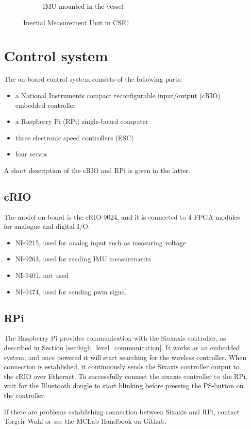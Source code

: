 \begin{figure}[htb!]
\begin{subfigure}{0.45\linewidth}
		\caption{IMU mounted in the vessel}
		\label{fig:IMU_mounted}
	\end{subfigure}
\caption{Inertial Measurement Unit in CSE1}
\end{figure}

\section{Control system}
The on-board control system consists of the following parts:
\begin{itemize}
	\item a National Instruments compact reconfigurable input/output (cRIO)
	embedded controller
	\item a Raspberry Pi (RPi) single-board computer
	\item three electronic speed controllers (ESC)
	\item four servos
\end{itemize}
A short description of the cRIO and RPi is given in the latter. 
\subsection{cRIO}
The model on-board is the cRIO-9024, and it is connected to 4 FPGA modules for analogue and digital I/O:
\begin{itemize}
	\item NI-9215, used for analog input such as measuring voltage
	\item NI-9263, used for reading IMU measurements
	\item NI-9401, not used
	\item NI-9474, used for sending pwm signal
\end{itemize}
\subsection{RPi}
The Raspberry Pi provides communication with the Siaxaxis controller, as described in Section \ref{sec:high_level_communication}. It works as an embedded system, and once powered it will start searching for the wireless controller. When connection is established, it continuously sends the Sixaxis controller output to the cRIO over Ethernet. To successfully connect the sixaxis controller to the RPi, wait for the Bluetooth dongle to start blinking before pressing the PS-button on the controller. 

If there are problems establishing connection between Sixaxis and RPi, contact Torgeir Wahl or see the MCLab Handbook on Github. 

